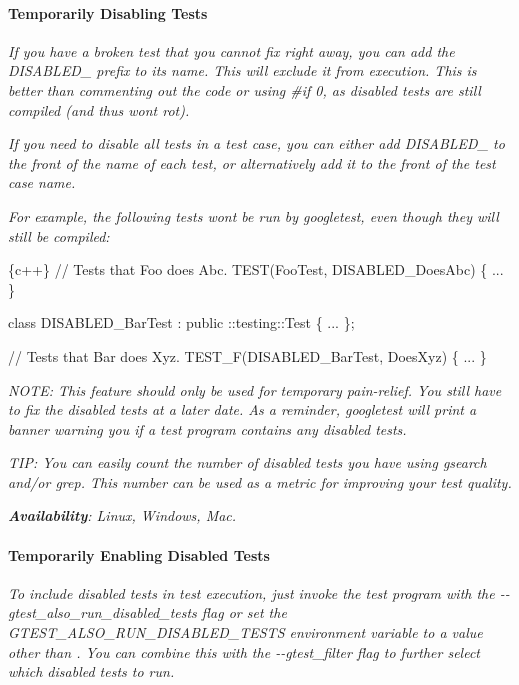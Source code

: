 {\itshape \paragraph*{Temporarily Disabling Tests}}

{\itshape }

{\itshape If you have a broken test that you cannot fix right away, you can add the {\ttfamily D\+I\+S\+A\+B\+L\+E\+D\+\_\+} prefix to its name. This will exclude it from execution. This is better than commenting out the code or using {\ttfamily \#if 0}, as disabled tests are still compiled (and thus won\textquotesingle{}t rot).}

{\itshape If you need to disable all tests in a test case, you can either add {\ttfamily D\+I\+S\+A\+B\+L\+E\+D\+\_\+} to the front of the name of each test, or alternatively add it to the front of the test case name.}

{\itshape For example, the following tests won\textquotesingle{}t be run by googletest, even though they will still be compiled\+:}

{\itshape 
\begin{DoxyCode}
\{c++\}
// Tests that Foo does Abc.
TEST(FooTest, DISABLED\_DoesAbc) \{ ... \}

class DISABLED\_BarTest : public ::testing::Test \{ ... \};

// Tests that Bar does Xyz.
TEST\_F(DISABLED\_BarTest, DoesXyz) \{ ... \}
\end{DoxyCode}
}

{\itshape N\+O\+TE\+: This feature should only be used for temporary pain-\/relief. You still have to fix the disabled tests at a later date. As a reminder, googletest will print a banner warning you if a test program contains any disabled tests.}

{\itshape T\+IP\+: You can easily count the number of disabled tests you have using {\ttfamily gsearch} and/or {\ttfamily grep}. This number can be used as a metric for improving your test quality.}

{\itshape {\bfseries Availability}\+: Linux, Windows, Mac.}

{\itshape \paragraph*{Temporarily Enabling Disabled Tests}}

{\itshape }

{\itshape To include disabled tests in test execution, just invoke the test program with the {\ttfamily -\/-\/gtest\+\_\+also\+\_\+run\+\_\+disabled\+\_\+tests} flag or set the {\ttfamily G\+T\+E\+S\+T\+\_\+\+A\+L\+S\+O\+\_\+\+R\+U\+N\+\_\+\+D\+I\+S\+A\+B\+L\+E\+D\+\_\+\+T\+E\+S\+TS} environment variable to a value other than {}. You can combine this with the {\ttfamily -\/-\/gtest\+\_\+filter} flag to further select which disabled tests to run.}

